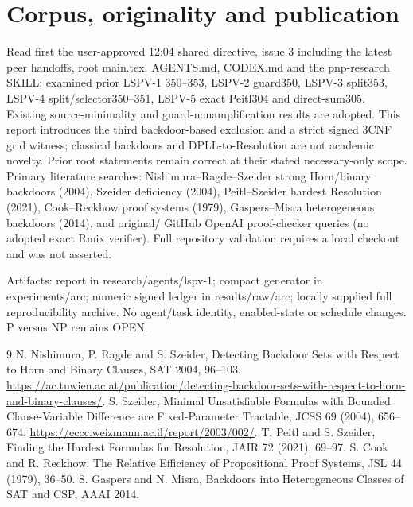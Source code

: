 \documentclass[11pt]{article}
\begin{document}
\section*{Corpus, originality and publication}
Read first the user-approved 12:04 shared directive, issue 3 including the latest peer handoffs, root main.tex, AGENTS.md, CODEX.md and the pnp-research SKILL; examined prior LSPV-1 350--353, LSPV-2 guard350, LSPV-3 split353, LSPV-4 split/selector350--351, LSPV-5 exact Peitl304 and direct-sum305. Existing source-minimality and guard-nonamplification results are adopted. This report introduces the third backdoor-based exclusion and a strict signed 3CNF grid witness; classical backdoors and DPLL-to-Resolution are not academic novelty. Prior root statements remain correct at their stated necessary-only scope. Primary literature searches: Nishimura--Ragde--Szeider strong Horn/binary backdoors (2004), Szeider deficiency (2004), Peitl--Szeider hardest Resolution (2021), Cook--Reckhow proof systems (1979), Gaspers--Misra heterogeneous backdoors (2014), and original/ GitHub OpenAI proof-checker queries (no adopted exact Rmix verifier). Full repository validation requires a local checkout and was not asserted.

Artifacts: report in research/agents/lspv-1; compact generator in experiments/arc; numeric signed ledger in results/raw/arc; locally supplied full reproducibility archive. No agent/task identity, enabled-state or schedule changes. P versus NP remains OPEN.
\begin{thebibliography}{9}
 N. Nishimura, P. Ragde and S. Szeider, Detecting Backdoor Sets with Respect to Horn and Binary Clauses, SAT 2004, 96--103. \url{https://ac.tuwien.ac.at/publication/detecting-backdoor-sets-with-respect-to-horn-and-binary-clauses/}.
 S. Szeider, Minimal Unsatisfiable Formulas with Bounded Clause-Variable Difference are Fixed-Parameter Tractable, JCSS 69 (2004), 656--674. \url{https://eccc.weizmann.ac.il/report/2003/002/}.
 T. Peitl and S. Szeider, Finding the Hardest Formulas for Resolution, JAIR 72 (2021), 69--97.
 S. Cook and R. Reckhow, The Relative Efficiency of Propositional Proof Systems, JSL 44 (1979), 36--50.
 S. Gaspers and N. Misra, Backdoors into Heterogeneous Classes of SAT and CSP, AAAI 2014.
\end{thebibliography}
\end{document}
